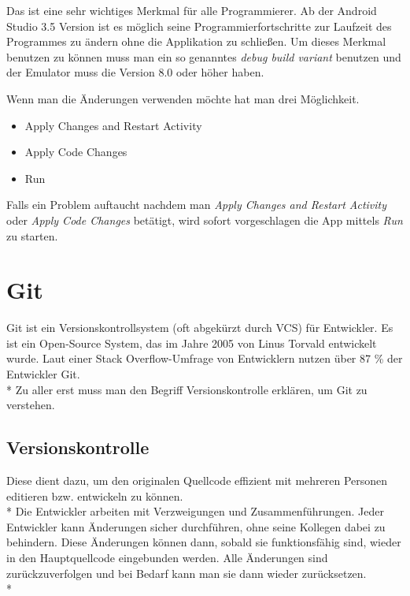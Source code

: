 Das ist eine sehr wichtiges Merkmal für alle Programmierer. Ab der Android Studio 3.5 Version ist es möglich seine Programmierfortschritte
zur Laufzeit des Programmes zu ändern ohne die Applikation zu schließen. Um dieses Merkmal benutzen zu können muss man ein so genanntes \textit{debug build variant} benutzen
und der Emulator muss die Version 8.0 oder höher haben. 

Wenn man die Änderungen verwenden möchte hat man drei Möglichkeit.
\begin{itemize}
    \item Apply Changes and Restart Activity
    \item Apply Code Changes 
    \item Run 
\end{itemize}

Falls ein Problem auftaucht nachdem man \textit{Apply Changes and Restart Activity} oder \textit{Apply Code Changes} betätigt,
wird sofort vorgeschlagen die App mittels \textit{Run} zu starten. 

\section{Git}
\author{Benjamin Besic}
Git ist ein Versionskontrollsystem (oft abgekürzt durch VCS) für Entwickler. Es ist ein Open-Source System, das im Jahre 2005
von Linus Torvald entwickelt wurde. Laut einer Stack Overflow-Umfrage von Entwicklern nutzen über 87 \% der Entwickler Git.
\cite{GitKinsta}
\\* Zu aller erst muss man den Begriff Versionskontrolle erklären, um Git zu verstehen.
\subsection{Versionskontrolle}
Diese dient dazu, um den originalen Quellcode effizient mit mehreren Personen editieren bzw. entwickeln zu können. 
\\* Die Entwickler arbeiten mit Verzweigungen und Zusammenführungen. Jeder Entwickler kann Änderungen sicher durchführen, ohne seine Kollegen dabei 
zu behindern. Diese Änderungen können dann, sobald sie funktionsfähig sind, wieder in den Hauptquellcode eingebunden werden.
Alle Änderungen sind zurückzuverfolgen und bei Bedarf kann man sie dann wieder zurücksetzen.
\cite{GitKinsta} \\*

